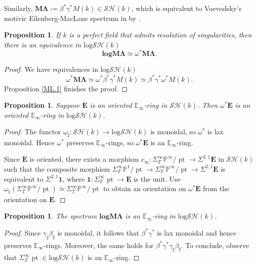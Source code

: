 \documentclass[11pt, a4paper]{amsart}
\newtheorem{prop}[thm]{Proposition}
\theoremstyle{definition}
\numberwithin{equation}{subsection}
\renewcommand{\P}{\mathbb{P}}
\newcommand{\E}{\mathbb{E}}
\newcommand{\pt}[1]{\mathrm{\pt}_{#1}}
\newcommand{\spectML}{\mathbf{M\Lambda}}
\newcommand{\spectlogML}{\mathbf{logM\Lambda}}
\def\pt{\operatorname{pt}}
\newcommand{\unit}{\mathbf{1}}
\newcommand{\ringE}{\mathbf{E}}
\newcommand{\infSH}{\mathcal{SH}}
\newcommand{\inflogSH}{\mathrm{log}\mathcal{SH}}
\begin{document}
Similarly, 
$\spectML:=\beta^*\gamma^*M(k)\in \infSH(k)$, 
which is equivalent to Voevodsky's motivic Eilenberg-MacLane spectrum in 
\cite[\S 6.1]{zbMATH01194164} by \cite[Example 3.4, Lemma 4.6]{DRO}.

\begin{prop}
\label{ML.5}
If $k$ is a perfect field that admits resolution of singularities, then there is an equivalence in $\inflogSH(k)$
\[
\spectlogML
\simeq
\omega^*\spectML.
\]
\end{prop}
\begin{proof}
We have equivalences in $\inflogSH(k)$
\[
\omega^*\spectML
\simeq
\omega^*\beta^*\gamma^*M(k)
\simeq
\beta^*\gamma^*\omega^*M(k).
\]
Proposition \ref{ML.1} finishes the proof.
\end{proof}


\begin{prop}
\label{ML.3}
Suppose $\ringE$ is an oriented $\E_\infty$-ring in $\infSH(k)$. 
Then $\omega^*\ringE$ is an oriented $\E_\infty$-ring in $\inflogSH(k)$.
\end{prop}
\begin{proof}
The functor $\omega_\sharp\colon \infSH(k)\to \inflogSH(k)$ is monoidal, so $\omega^*$ is lax monoidal.
Hence $\omega^*$ preserves $\E_\infty$-rings, so $\omega^*\ringE$ is an $\E_\infty$-ring.

Since $\ringE$ is oriented, 
there exists a morphism $c_\infty \colon \Sigma_T^\infty \P^\infty/\pt \to \Sigma^{2,1}\ringE$ in $\infSH(k)$ 
such that the composite morphism 
$\Sigma_T^\infty \P^1/\pt \to \Sigma_T^\infty \P^\infty/\pt \to \Sigma^{2,1}\ringE$ 
is equivalent to $\Sigma^{2,1}\unit$, 
where $\unit\colon \Sigma_T^\infty \pt \to \ringE$ is the unit.
Use $\omega_\sharp (\Sigma_T^\infty \P^\infty/\pt)\simeq \Sigma_T^\infty \P^\infty/\pt$ to obtain an orientation 
on $\omega^*\ringE$ from the orientation on $\ringE$.
\end{proof}

\begin{prop}
The spectrum $\spectlogML$ is an $\E_\infty$-ring in $\inflogSH(k)$.
\end{prop}
\begin{proof}
Since $\gamma_\sharp \beta_\sharp$ is monoidal, 
it follows that $\beta^*\gamma^*$ is lax monoidal and hence preserves $\E_\infty$-rings.
Moreover, 
the same holds for $\beta^*\gamma^*\gamma_\sharp \beta_\sharp$.
To conclude, 
observe that $\Sigma_T^\infty \pt\in \inflogSH(k)$ is an $\E_\infty$-ring.
\end{proof}
\end{document}
